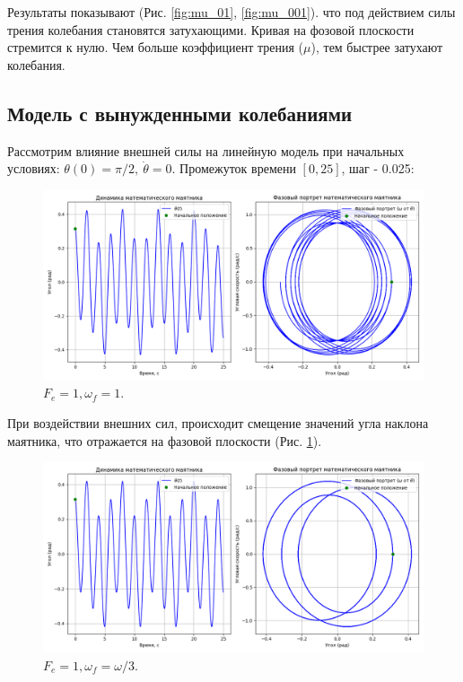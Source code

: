 Результаты показывают (Рис. \ref{fig:mu_01}, \ref{fig:mu_001}). что под действием силы трения колебания становятся затухающими. Кривая на фозовой плоскости стремится к нулю. Чем больше коэффициент трения ($\mu$), тем быстрее затухают колебания.

\subsection*{Модель с вынужденными колебаниями}
Рассмотрим влияние внешней силы на линейную модель при начальных условиях: $\theta(0) = \pi /2, \ \dot{\theta} = 0$. Промежуток времени $[0,25]$, шаг - 0.025:
\begin{figure}[h]  %
	\centering
	\includegraphics[width=1\textwidth]{imgs/f1w1.png}  %
	\caption{$F_e = 1, \omega_f = 1$.}  %
	\label{fig:f1_w1}  %
\end{figure}

При воздействии внешних сил, происходит смещение значений угла наклона маятника, что отражается на фазовой плоскости (Рис. \ref{fig:f1_w1}).

\begin{figure}[h]  %
	\centering
	\includegraphics[width=1\textwidth]{imgs/f1ww3.png}  %
	\caption{$F_e = 1, \omega_f = \omega/3$.}  %
	\label{fig:f1_ww3}  %
\end{figure}

